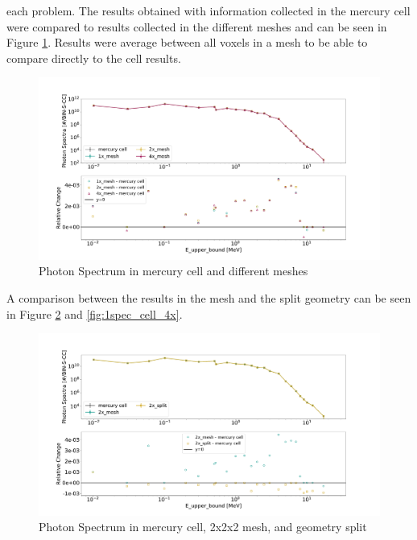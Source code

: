each problem. The results obtained with information collected in the mercury
cell were compared to results collected in the different meshes and can be seen
in Figure \ref{fig:1spec_cell_1x_2x_4x}. Results were average between all voxels
in a mesh to be able to compare directly to the cell results.
%
\begin{figure}[H]
 \centering
 \includegraphics[scale=0.42,trim={2cm 0.5cm 3cm 2cm},clip]{../figs/toy_p1/spec_VPI_1x_2x_4x.pdf}
 \caption{Photon Spectrum in mercury cell and different meshes}
 \label{fig:1spec_cell_1x_2x_4x}
\end{figure}
%
A comparison between the results in the mesh and the split geometry can be seen
in Figure \ref{fig:1spec_cell_2x} and \ref{fig:1spec_cell_4x}.
%
\begin{figure}[H]
 \centering
 \includegraphics[scale=0.42,trim={2cm 0.5cm 3cm 2cm},clip]{../figs/toy_p1/spec_VPI_2x.pdf}
 \caption{Photon Spectrum in mercury cell, 2x2x2 mesh, and geometry split}
 \label{fig:1spec_cell_2x}
\end{figure}
